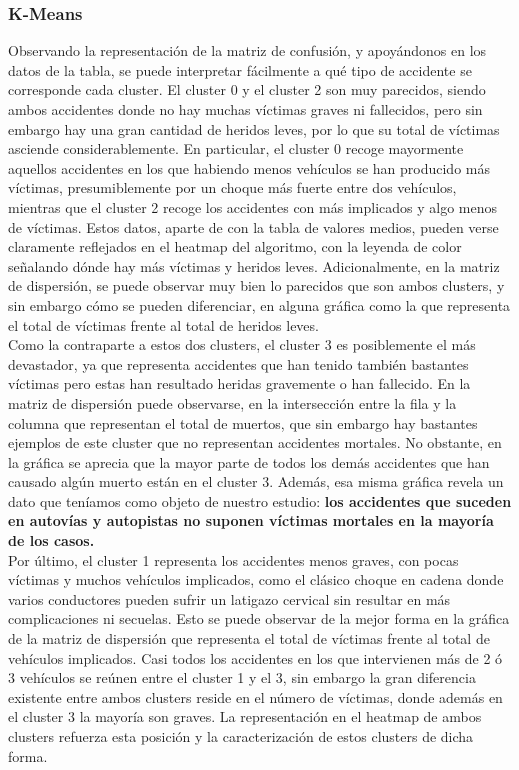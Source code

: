 	\subsubsection{K-Means}
	Observando la representación de la matriz de confusión, y apoyándonos en los datos de la tabla, se puede interpretar fácilmente a qué tipo de accidente se corresponde cada cluster. El cluster 0 y el cluster 2 son muy parecidos, siendo ambos accidentes donde no hay muchas víctimas graves ni fallecidos, pero sin embargo hay una gran cantidad de heridos leves, por lo que su total de víctimas asciende considerablemente. En particular, el cluster 0 recoge mayormente aquellos accidentes en los que habiendo menos vehículos se han producido más víctimas, presumiblemente por un choque más fuerte entre dos vehículos, mientras que el cluster 2 recoge los accidentes con más implicados y algo menos de víctimas. Estos datos, aparte de con la tabla de valores medios, pueden verse claramente reflejados en el heatmap del algoritmo, con la leyenda de color señalando dónde hay más víctimas y heridos leves. Adicionalmente, en la matriz de dispersión, se puede observar muy bien lo parecidos que son ambos clusters, y sin embargo cómo se pueden diferenciar, en alguna gráfica como la que representa el total de víctimas frente al total de heridos leves.\\
	
	Como la contraparte a estos dos clusters, el cluster 3 es posiblemente el más devastador, ya que representa accidentes que han tenido también bastantes víctimas pero estas han resultado heridas gravemente o han fallecido. En la matriz de dispersión puede observarse, en la intersección entre la fila y la columna que representan el total de muertos, que sin embargo hay bastantes ejemplos de este cluster que no representan accidentes mortales. No obstante, en la gráfica se aprecia que la mayor parte de todos los demás accidentes que han causado algún muerto están en el cluster 3. Además, esa misma gráfica revela un dato que teníamos como objeto de nuestro estudio: \textbf{los accidentes que suceden en autovías y autopistas no suponen víctimas mortales en la mayoría de los casos.}\\
	
	Por último, el cluster 1 representa los accidentes menos graves, con pocas víctimas y muchos vehículos implicados, como el clásico choque en cadena donde varios conductores pueden sufrir un latigazo cervical sin resultar en más complicaciones ni secuelas. Esto se puede observar de la mejor forma en la gráfica de la matriz de dispersión que representa el total de víctimas frente al total de vehículos implicados. Casi todos los accidentes en los que intervienen más de 2 ó 3 vehículos se reúnen entre el cluster 1 y el 3, sin embargo la gran diferencia existente entre ambos clusters reside en el número de víctimas, donde además en el cluster 3 la mayoría son graves. La representación en el heatmap de ambos clusters refuerza esta posición y la caracterización de estos clusters de dicha forma.
	
